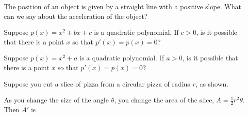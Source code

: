 \documentclass{ximera}
\newcommand{\recommendation}[1]{}
\newcommand{\GoodQuestions}[1]{}
\begin{document}
\begin{problem}
  The position of an object is given by a straight line with a
  positive slope.  What can we say about the acceleration of the
  object?
  \begin{multipleChoice}
  \end{multipleChoice}
\end{problem}



\begin{problem}
  Suppose $p(x) = x^2 + bx + c$ is a quadratic polynomial.  If $c > 0$, is it possible that there is a point $x$ so that $p'(x) = p(x) = 0$?
  \begin{multipleChoice}
  \end{multipleChoice}
\end{problem}

\begin{problem}
  Suppose $p(x) = x^2 + a$ is a quadratic polynomial.  If $a > 0$, is it possible that there is a point $x$ so that $p'(x) = p(x) = 0$?
  \begin{multipleChoice}
  \end{multipleChoice}
\end{problem}

\begin{problem}
  \recommendation{Vic}

  \GoodQuestions{Subject: Derivative Rules 4Q}
  Suppose you cut a slice of pizza from a circular pizza of radius
  $r$, as shown.
  \begin{image}
  \end{image}
  As you change the size of the angle $\theta$, you change the area of
  the slice, $A=\frac{1}{2}r^2\theta$. Then $A'$ is
  \begin{multipleChoice}
  \end{multipleChoice}
\end{problem}
\end{document}
